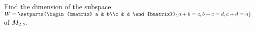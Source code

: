 Find the dimension of the subspace 
$W = \setparts{\begin{bmatrix} a & b\\c & d \end{bmatrix}}{a + b = c, b + c = d, c + d = a}$ 
of $M_{2,2}$.